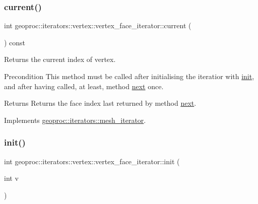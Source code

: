\subsubsection{\texorpdfstring{current()}{current()}}
{\footnotesize\ttfamily int geoproc\+::iterators\+::vertex\+::vertex\+\_\+face\+\_\+iterator\+::current (\begin{DoxyParamCaption}{ }\end{DoxyParamCaption}) const\hspace{0.3cm}{\ttfamily [virtual]}}



Returns the current index of vertex. 

\begin{DoxyPrecond}{Precondition}
This method must be called after initialising the iteratior with \hyperlink{classgeoproc_1_1iterators_1_1vertex_1_1vertex__face__iterator_a713d8d9edb7121c729b5717261fd8b3b}{init}, and after having called, at least, method \hyperlink{classgeoproc_1_1iterators_1_1vertex_1_1vertex__face__iterator_aa2a7fb3ee7e703d815e7f1664fbd99d4}{next} once. 
\end{DoxyPrecond}
\begin{DoxyReturn}{Returns}
Returns the face index last returned by method \hyperlink{classgeoproc_1_1iterators_1_1vertex_1_1vertex__face__iterator_aa2a7fb3ee7e703d815e7f1664fbd99d4}{next}. 
\end{DoxyReturn}


Implements \hyperlink{classgeoproc_1_1iterators_1_1mesh__iterator_ae6151b065602980d37a582977083ef42}{geoproc\+::iterators\+::mesh\+\_\+iterator}.

\mbox{\label{classgeoproc_1_1iterators_1_1vertex_1_1vertex__face__iterator_a713d8d9edb7121c729b5717261fd8b3b}} 
\subsubsection{\texorpdfstring{init()}{init()}}
{\footnotesize\ttfamily int geoproc\+::iterators\+::vertex\+::vertex\+\_\+face\+\_\+iterator\+::init (\begin{DoxyParamCaption}\item[{int}]{v }\end{DoxyParamCaption})\hspace{0.3cm}{\ttfamily [virtual]}}



